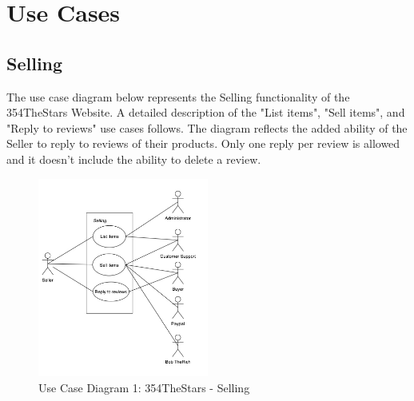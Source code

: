\documentclass[11pt]{article}
\newcounter{use case ID}
\begin{document}
\section{Use Cases}
\subsection{Selling}

The use case diagram below represents the Selling functionality of the 354TheStars Website. A detailed description of the "List items", "Sell items", and "Reply to reviews" use cases follows. The diagram reflects the added ability of the Seller to reply to reviews of their products. Only one reply per review is allowed and it doesn't include the ability to delete a review.

\begin{figure}[htbp]
    \centering
    \includegraphics[width=0.5\textwidth]{Diagrams/Use_Case/ucdselling.png}
    \caption{Use Case Diagram 1: 354TheStars - Selling }
    \label{fig:ucd1}
\end{figure}
\end{document}

